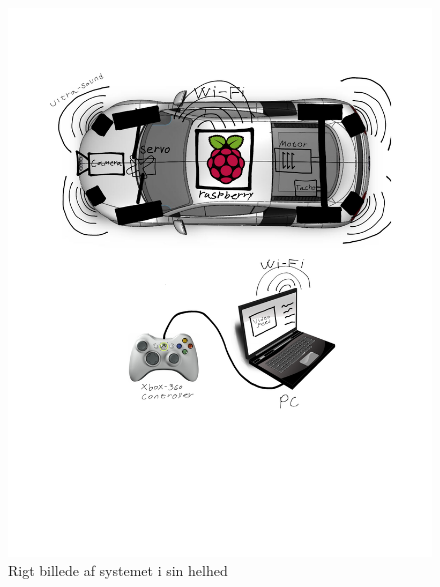 \begin{figure}[h]
\centering
\includegraphics[width=\textwidth - 7.38 cm]{../fig/billeder/rigbillede}
\caption{Rigt billede af systemet i sin helhed}
\label{fig:rigbillede}
\end{figure}